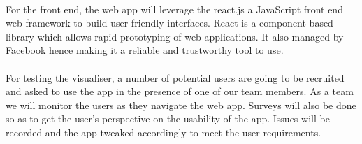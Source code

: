 \paragraph{}
For the front end, the web app will leverage the react.js a JavaScript front end web framework to build user-friendly interfaces. React is a component-based library which allows rapid prototyping of web applications\cite{Gackenheimer2015}. It also managed by Facebook hence making it a reliable and trustworthy tool to use.
\paragraph{}
For testing the visualiser, a number of potential users are going to be recruited and asked to use the app in the presence of one of our team members. As a team we will monitor the users as they navigate the web app. Surveys will also be done so as to get the user's perspective on the usability of the app. Issues will be recorded and the app tweaked accordingly to meet the user requirements.
